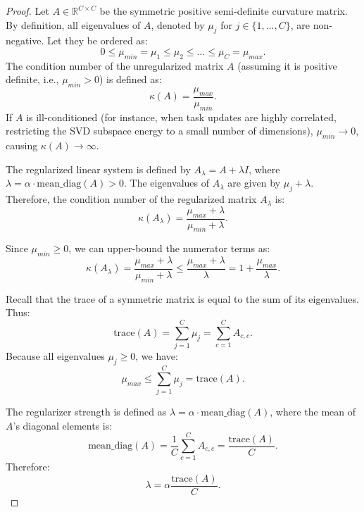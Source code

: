 \documentclass{article}
\theoremstyle{plain}
\theoremstyle{definition}
\theoremstyle{remark}
\begin{document}
\begin{proof}
Let $A \in \mathbb{R}^{C \times C}$ be the symmetric positive semi-definite curvature matrix.
By definition, all eigenvalues of $A$, denoted by $\mu_j$ for $j \in \{1, \dots, C\}$, are non-negative. Let they be ordered as:
\begin{equation}
    0 \le \mu_{min} = \mu_1 \le \mu_2 \le \dots \le \mu_C = \mu_{max}.
\end{equation}
The condition number of the unregularized matrix $A$ (assuming it is positive definite, i.e., $\mu_{min} > 0$) is defined as:
\begin{equation}
    \kappa(A) = \frac{\mu_{max}}{\mu_{min}}.
\end{equation}
If $A$ is ill-conditioned (for instance, when task updates are highly correlated, restricting the SVD subspace energy to a small number of dimensions), $\mu_{min} \to 0$, causing $\kappa(A) \to \infty$.

The regularized linear system is defined by $A_{\lambda} = A + \lambda I$, where $\lambda = \alpha \cdot \text{mean\_diag}(A) > 0$.
The eigenvalues of $A_{\lambda}$ are given by $\mu_j + \lambda$.
Therefore, the condition number of the regularized matrix $A_{\lambda}$ is:
\begin{equation}
    \kappa(A_{\lambda}) = \frac{\mu_{max} + \lambda}{\mu_{min} + \lambda}.
\end{equation}

Since $\mu_{min} \ge 0$, we can upper-bound the numerator terms as:
\begin{equation}
    \kappa(A_{\lambda}) = \frac{\mu_{max} + \lambda}{\mu_{min} + \lambda} \le \frac{\mu_{max} + \lambda}{\lambda} = 1 + \frac{\mu_{max}}{\lambda}.
\end{equation}

Recall that the trace of a symmetric matrix is equal to the sum of its eigenvalues. Thus:
\begin{equation}
    \text{trace}(A) = \sum_{j=1}^C \mu_j = \sum_{c=1}^C A_{c,c}.
\end{equation}
Because all eigenvalues $\mu_j \ge 0$, we have:
\begin{equation}
    \mu_{max} \le \sum_{j=1}^C \mu_j = \text{trace}(A).
\end{equation}

The regularizer strength is defined as $\lambda = \alpha \cdot \text{mean\_diag}(A)$, where the mean of $A$'s diagonal elements is:
\begin{equation}
    \text{mean\_diag}(A) = \frac{1}{C} \sum_{c=1}^C A_{c,c} = \frac{\text{trace}(A)}{C}.
\end{equation}
Therefore:
\begin{equation}
    \lambda = \alpha \frac{\text{trace}(A)}{C}.
\end{equation}


\end{proof}
\end{document}
